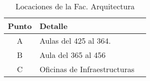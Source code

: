 \begin{table}[H]
  \begin{center}
    \begin{tabularx}{\textwidth}{ c  X  C{2.3cm} }
      \toprule
        \textbf{Punto} &
        \textbf{Detalle}\\

      \midrule
        A
        &
        Aulas del 425 al 364.
        \\

      \addlinespace
        B
        &
        Aula del 365 al 456 \\

      \addlinespace
        C
        &
        Oficinas de Infraestructuras \\


      \bottomrule
    \end{tabularx}
    \caption{Locaciones de la Fac. Arquitectura}
    \label{tab:lugares_arquitectura}
  \end{center}
\end{table}
